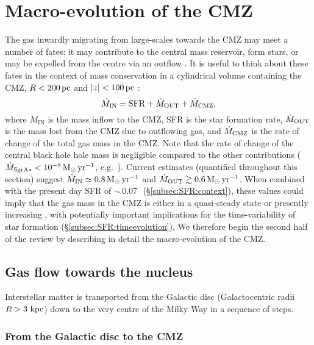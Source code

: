 \section{Macro-evolution of the CMZ} 
\label{sec:macroevolution}
The gas inwardly migrating from large-scales towards the CMZ may meet a number of fates: it may contribute to the central mass reservoir, form stars, or may be expelled from the centre via an outflow \citep{Morris1996}.
It is useful to think about these fates in the context of mass conservation in a cylindrical volume containing the CMZ, $R<200\, \mbox{${\rm pc}$}$ and $|z|<100\, \mbox{${\rm pc}$}$ \citep[e.g.][]{Crocker2012}:
\begin{equation}
    \dot{M}_\mathrm{IN} = {\rm SFR} +  \dot{M}_{\rm OUT} + \dot{M}_{\rm CMZ},
\end{equation}
where $\dot{M}_\mathrm{IN}$ is the mass inflow to the CMZ, SFR is the star formation rate, $\dot{M}_{\rm OUT}$ is the mass lost from the CMZ due to outflowing gas, and $\dot{M}_{\rm CMZ}$ is the rate of change of the total gas mass in the CMZ. Note that the rate of change of the central black hole hole mass is negligible compared to the other contributions ($\dot{M}_{\rm SgrA*}<10^{-8}\,\mbox{M$_\odot$}\,\mbox{${\rm yr}$}^{-1}$, e.g.\ \citealt{Genzel2010}). Current estimates (quantified throughout this section) suggest $\dot{M}_\mathrm{IN}\simeq 0.8\,\mbox{M$_\odot$}\,\mbox{${\rm yr}$}^{-1}$ and $\dot{M}_{\rm OUT}\gtrsim0.6\,\mbox{M$_\odot$}\,\mbox{${\rm yr}$}^{-1}$. When combined with the present day SFR of $\sim$\,0.07\,\msunyr\ (\S\ref{subsec:SFR:context}), these values could imply that the gas mass in the CMZ is either in a quasi-steady state or presently increasing \citep{Crocker2012, Krumholz2015,Sormani2019b}, with potentially important implications for the time-variability of star formation (\S\ref{subsec:SFR:timeevolution}). We therefore begin the second half of the review by describing in detail the macro-evolution of the CMZ. 

\subsection{Gas flow towards the nucleus}
\label{sec:inwardmassflow}

Interstellar matter is transported from the Galactic disc (Galactocentric radii $R>3~\mbox{${\rm kpc}$}$) down to the very centre of the Milky Way in a sequence of steps. 

\subsubsection{From the Galactic disc to the CMZ} \label{sec:barinflow}

